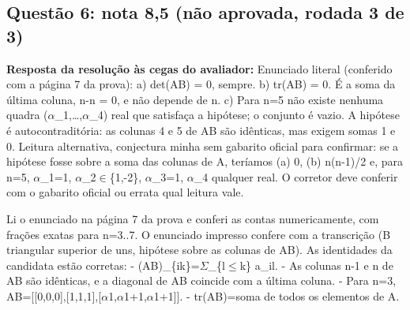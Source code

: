 \documentclass{article}%
\begin{document}
\subsection*{Questão 6: nota 8,5 (não aprovada, rodada 3 de 3)}%
\textbf{Resposta da resolução às cegas do avaliador:} Enunciado literal (conferido com a página 7 da prova):\newline%
a) det(AB) = 0, sempre.\newline%
b) tr(AB) = 0. É a soma da última coluna, n-n = 0, e não depende de n.\newline%
c) Para n=5 não existe nenhuma quadra ($\alpha$\_1,\ldots{},$\alpha$\_4) real que satisfaça a hipótese; o conjunto é vazio. A hipótese é autocontraditória: as colunas 4 e 5 de AB são idênticas, mas exigem somas 1 e 0.\newline%
\newline%
Leitura alternativa, conjectura minha sem gabarito oficial para confirmar: se a hipótese fosse sobre a soma das colunas de A, teríamos (a) 0, (b) n(n-1)/2 e, para n=5, $\alpha$\_1=1, $\alpha$\_2$\in$\{1,-2\}, $\alpha$\_3=1, $\alpha$\_4 qualquer real.\newline%
\newline%
O corretor deve conferir com o gabarito oficial ou errata qual leitura vale.\par %
Li o enunciado na página 7 da prova e conferi as contas numericamente, com frações exatas para n=3..7. O enunciado impresso confere com a transcrição (B triangular superior de uns, hipótese sobre as colunas de AB).\newline%
\newline%
As identidades da candidata estão corretas:\newline%
{-} (AB)\_\{ik\}=$\Sigma$\_\{l$\leq$k\} a\_il.\newline%
{-} As colunas n-1 e n de AB são idênticas, e a diagonal de AB coincide com a última coluna.\newline%
{-} Para n=3, AB={[}{[}0,0,0{]},{[}1,1,1{]},{[}$\alpha$1,$\alpha$1+1,$\alpha$1+1{]}{]}.\newline%
{-} tr(AB)=soma de todos os elementos de A.\newline%
\end{document}
